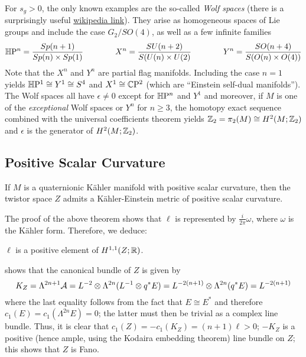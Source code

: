 \documentclass{scrartcl}
\begin{document}
For $s_g>0$, the only known examples are the so-called \emph{Wolf spaces} (there is a surprisingly useful \href{https://en.wikipedia.org/wiki/Quaternion-K%C3%A4hler_symmetric_space}{wikipedia link}).
They arise as homogeneous spaces of Lie groups and include the case $G_2/SO(4)$, as well as a few infinite families
\begin{equation*}
	\mathbb{H}\mathrm{P}^n=\frac{Sp(n+1)}{Sp(n)\times Sp(1)}\qquad\qquad 
	X^n=\frac{SU(n+2)}{S(U(n)\times U(2)}\qquad\qquad
	Y^n=\frac{SO(n+4)}{S(O(n)\times O(4))}
\end{equation*}
Note that the $X^n$ and $Y^n$ are partial flag manifolds. Including the case $n=1$ yields $\mathbb{H}\mathrm{P}^1\cong Y^1\cong S^4$ and $X^1\cong \mathbb{C}\mathrm{P}^2$ (which are ``Einstein self-dual manifolds''). The Wolf spaces all have $\epsilon\neq 0$ except for $\mathbb{H}\mathrm{P}^n$ and $Y^1$ and moreover, if $M$ is one of the \emph{exceptional} Wolf spaces or $Y^n$ for $n\geq 3$, the homotopy exact sequence combined with the universal coefficients theorem yields $\mathbb{Z}_2=\pi_2(M)\cong H^2(M;\mathbb{Z}_2)$ and $\epsilon$ is the generator of $H^2(M;\mathbb{Z}_2)$.


\subsection{Positive Scalar Curvature}

\begin{thm}
	If $M$ is a quaternionic K\"ahler manifold with positive scalar curvature, then the twistor space $Z$ admits a K\"ahler-Einstein metric of positive scalar curvature.
\end{thm}
\begin{myproof}
\end{myproof}

The proof of the above theorem shows that $\ell$ is represented by $\frac{i}{2\pi}\omega$, where $\omega$ is the K\"ahler form. Therefore, we deduce:

\begin{cor}
	$\ell$ is a positive element of $H^{1,1}(Z;\mathbb{R})$.
\end{cor}

 shows that the canonical bundle of $Z$ is given by
\begin{equation*}
	K_Z=\Lambda^{2n+1}\mathcal{A}=L^{-2}\otimes \Lambda^{2n}(L^{-1}\otimes q^*E)=L^{-2(n+1)}\otimes \Lambda^{2n}(q^*E)
	=L^{-2(n+1)}
\end{equation*}
where the last equality follows from the fact that $E\cong E^*$ and therefore $c_1(E)=c_1(\Lambda^{2n}E)=0$; the latter must then be trivial as a complex line bundle. Thus, it is clear that $c_1(Z)=-c_1(K_Z)=(n+1)\ell>0$; $-K_Z$ is a positive (hence ample, using the Kodaira embedding theorem) line bundle on $Z$; this shows that $Z$ is Fano. 
\end{document}
